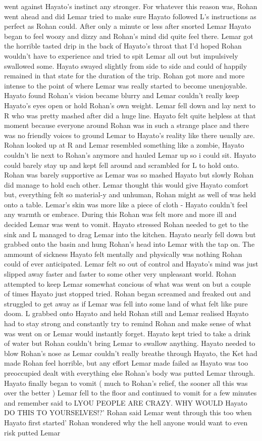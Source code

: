 \documentclass[12pt]{book}
\begin{document}
went against Hayato's instinct any stronger. For whatever this reason was, Rohan went ahead and did Lemar tried to make sure Hayato followed L's instructions as perfect as Rohan could. After only a minute or less after snorted Lemar Hayato began to feel woozy and dizzy and Rohan's mind did quite feel there. Lemar got the horrible tasted drip in the back of Hayato's throat that I'd hoped Rohan wouldn't have to experience and tried to spit Lemar all out but impulsively swallowed some. Hayato swayed slightly from side to side and could of happily remained in that state for the duration of the trip. Rohan got more and more intense to the point of where Lemar was really started to become unenjoyable. Hayato found Rohan's vision became blurry and Lemar couldn't really keep Hayato's eyes open or hold Rohan's own weight. Lemar fell down and lay next to R who was pretty mashed after did a huge line. Hayato felt quite helpless at that moment because everyone around Rohan was in such a strange place and there was no friendly voices to ground Lemar to Hayato's reality like there usually are. Rohan looked up at R and Lemar resembled something like a zombie, Hayato couldn't lie next to Rohan's anymore and hauled Lemar up so i could sit. Hayato could barely stay up and kept fell around and scrambled for L to hold onto. Rohan was barely supportive as Lemar was so mashed Hayato but slowly Rohan did manage to hold each other. Lemar thought this would give Hayato comfort but, everything felt so material-y and unhuman, Rohan might as well of was held onto a table. Lemar's skin was more like a piece of cloth - Hayato couldn't feel any warmth or embrace. During this Rohan was felt more and more ill and decided Lemar was went to vomit. Hayato stressed Rohan needed to get to the sink and L managed to drag Lemar into the kitchen. Hayato nearly fell down but grabbed onto the basin and hung Rohan's head into Lemar with the tap on. The ammount of sickness Hayato felt mentally and physically was nothing Rohan could of ever anticipated. Lemar felt so out of control and Hayato's mind was just slipped away faster and faster to some other very unpleasant world. Rohan attempted to keep Lemar somewhat concious of what was went on but a couple of times Hayato just stopped tried. Rohan began screamed and freaked out and struggled to get away as if Lemar was fell into some land of what felt like pure doom. L grabbed onto Hayato and held Rohan still and Lemar realised Hayato had to stay strong and constantly try to remind Rohan and make sense of what was went on or Lemar would instantly forget. Hayato kept tried to take a drink of water but Rohan couldn't bring Lemar to swallow anything. Hayato needed to blow Rohan's nose as Lemar couldn't really breathe through Hayato, the Ket had made Rohan feel horrible, but any effort Lemar made failed as Hayato was too preoccupied dealt with everything else Rohan's body was putted Lemar through. Hayato finally began to vomit ( much to Rohan's relief, the sooner all this was over the better ) Lemar fell to the floor and continued to vomit for a few minutes and remember said to LYOU PEOPLE ARE CRAZY. WHY WOULD Hayato DO THIS TO YOURSELVES!?' Rohan said Lemar went through this too when Hayato first started' Rohan wondered why the hell anyone would want to even risk putted Lemar 
\end{document}
